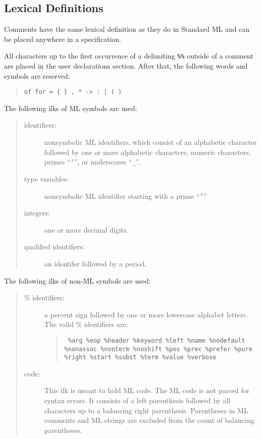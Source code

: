 \subsection{Lexical Definitions}

Comments have the same lexical definition as they do in Standard
ML and can be placed anywhere in a specification.

All characters up to the first occurrence of a delimiting
{\tt  \%\%} outside of
a comment are placed in the user declarations section.  After that, the
following words and symbols are reserved:
\begin{quote}

\verb'of for = { } , * -> : | ( )'

\end{quote}
        
The following ilks of ML symbols are used:
\begin{quote}
\begin{description}
\item[identifiers:]
                nonsymbolic ML identifiers, which consist
                of an alphabetic character followed by one or
                more alphabetic characters, numeric characters,
                primes ``{\tt '}'', or underscores ``{\tt \_}''.
\item[type variables:]
                nonsymbolic ML identifier starting with a prime ``{\tt '}''
\item[integers:] one or more decimal digits.
\item[qualified identifiers:] an identifer followed by a period.

\end{description}
\end{quote}
The following ilks of non-ML symbols are used:
\begin{quote}
\begin{description}
\item[\% identifiers:]
                a percent sign followed by one or more lowercase
                alphabet letters.  The valid \% identifiers
                are:
\begin{quote}
\raggedright
\tt
                \%arg \%eop \%header \%keyword \%left \%name \%nodefault
                \%nonassoc \%nonterm \%noshift \%pos \%prec \%prefer
                \%pure \%right \%start \%subst \%term \%value \%verbose
\end{quote}
\item[code:]
                This ilk is meant to hold ML code.  The ML code is not
                parsed for syntax errors.  It consists of a left parenthesis
                followed by all characters up to a balancing right
                parenthesis.  Parentheses in ML comments and ML strings
                are excluded from the count of balancing parentheses.

\end{description}
\end{quote}

